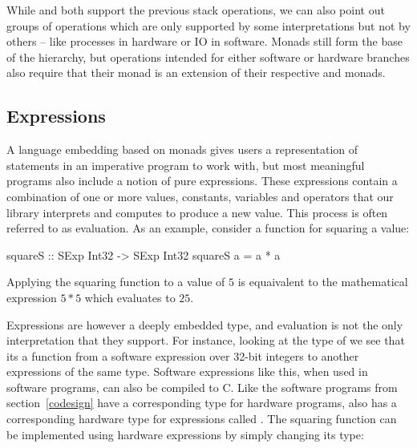 While  and  both support the previous stack operations, we can also point out groups of operations which are only supported by some interpretations but not by others -- like processes in hardware or IO in software. Monads still form the base of the hierarchy, but operations intended for either software or hardware branches also require that their monad is an extension of their respective  and  monads.


\subsection{Expressions}

A language embedding based on monads gives users a representation of statements in an imperative program to work with, but most meaningful programs also include a notion of pure expressions. These expressions contain a combination of one or more values, constants, variables and operators that our library interprets and computes to produce a new value. This process is often referred to as evaluation. As an example, consider a function for squaring a value:

\begin{code}
squareS :: SExp Int32 -> SExp Int32
squareS a = a * a
\end{code}

\noindent Applying the squaring function to a value of $5$ is equaivalent to the mathematical expression $5*5$ which evaluates to $25$.

Expressions are however a deeply embedded type, and evaluation is not the only interpretation that they support. For instance, looking at the type of  we see that its a function from a software expression over 32-bit integers to another expressions of the same type. Software expressions like this, when used in software programs, can also be compiled to C. Like the software programs from section~\ref{codesign} have a corresponding type for hardware programs,  also has a corresponding hardware type for expressions called . The squaring function can be implemented using hardware expressions by simply changing its type:


